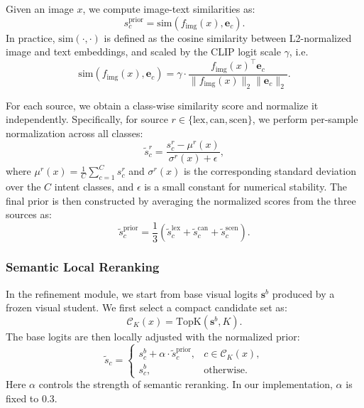 Given an image $x$, we compute image-text similarities as:
\begin{equation}
s^{\text{prior}}_c = \text{sim}(f_{\text{img}}(x), \mathbf{e}_c).
\end{equation}
In practice, $\text{sim}(\cdot,\cdot)$ is defined as the cosine similarity between L2-normalized image and text embeddings, and scaled by the CLIP logit scale $\gamma$, i.e.
\begin{equation}
\text{sim}(f_{\text{img}}(x), \mathbf{e}_c) = \gamma \cdot \frac{f_{\text{img}}(x)^\top \mathbf{e}_c}{\|f_{\text{img}}(x)\|_2 \|\mathbf{e}_c\|_2}.
\end{equation}

For each source, we obtain a class-wise similarity score and normalize it independently. Specifically, for source $r \in \{\text{lex}, \text{can}, \text{scen}\}$, we perform per-sample normalization across all classes:
\begin{equation}
\tilde{s}^{r}_c = \frac{s^{r}_c - \mu^{r}(x)}{\sigma^{r}(x) + \epsilon},
\end{equation}
where $\mu^{r}(x)=\frac{1}{C}\sum_{c=1}^{C}s^{r}_c$ and $\sigma^{r}(x)$ is the corresponding standard deviation over the $C$ intent classes, and $\epsilon$ is a small constant for numerical stability. The final prior is then constructed by averaging the normalized scores from the three sources as:
\begin{equation}
\tilde{s}^{\text{prior}}_c = \frac{1}{3}\left(\tilde{s}^{\text{lex}}_c + \tilde{s}^{\text{can}}_c + \tilde{s}^{\text{scen}}_c\right).
\end{equation}

\subsubsection{Semantic Local Reranking}

In the refinement module, we start from base visual logits $\mathbf{s}^{b}$ produced by a frozen visual student. We first select a compact candidate set as:
\begin{equation}
\mathcal{C}_K(x) = \text{TopK}(\mathbf{s}^{b}, K).
\end{equation}
The base logits are then locally adjusted with the normalized prior:
\begin{equation}
\tilde{s}_c =
\begin{cases}
s^{b}_c + \alpha \cdot \tilde{s}^{\text{prior}}_c, & c \in \mathcal{C}_K(x), \\
s^{b}_c, & \text{otherwise}.
\end{cases}
\end{equation}
Here $\alpha$ controls the strength of semantic reranking. In our implementation, $\alpha$ is fixed to 0.3.

